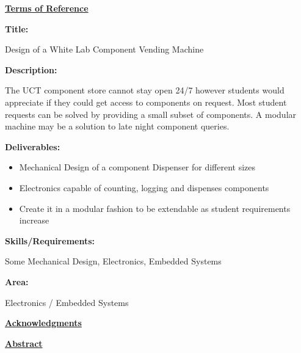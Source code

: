 \documentclass[a4paper,11pt]{article}
\numberwithin{figure}{section}
\begin{document}
	
	
	{\centering\Huge\bfseries\underline{Terms of Reference}\par}
	{\Large\bfseries{Title:}\par}
	Design of a White Lab Component Vending Machine\par
	{\Large\bfseries{Description:}\par}
	The UCT component store cannot stay open 24/7 however students would
appreciate if they could get access to components on request. Most student requests can be solved by providing a small subset of components. A modular machine may be a solution to late night component queries.\par
	{\Large\bfseries{Deliverables:}\par}
	{\begin{itemize}
	\item Mechanical Design of a component Dispenser for different sizes
	\item Electronics capable of counting, logging and dispenses components
	\item Create it in a modular fashion to be extendable as student
requirements increase
	\end{itemize}}
	{\Large\bfseries{Skills/Requirements:}\par}
	Some Mechanical Design, Electronics, Embedded Systems\par
	{\Large\bfseries{Area:}\par}
	Electronics / Embedded Systems\par
	\newpage
	
	{\centering\Huge\bfseries\underline{Acknowledgments}\par}
	\newpage
	
	
	{\centering\Huge\bfseries\underline{Abstract}\par}
	\newpage	
	
	\tableofcontents
	\newpage
		
	\listoffigures
	\newpage
 
	\listoftables
	\newpage
	
	\mbox{}
	 	 
	\printnomenclature[2cm]	
	
\end{document}
